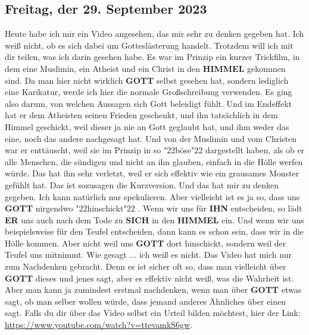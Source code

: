 \documentclass[10pt,a5paper]{article}
\newcommand{\Er}[0]{\textbf{ER}}
\newcommand{\Gott}[0]{\textbf{GOTT}}
\newcommand{\Himmel}[0]{\textbf{HIMMEL}}
\newcommand{\Ihn}[0]{\textbf{IHN}}
\newcommand{\Sich}[0]{\textbf{SICH}}
\newcommand{\q}[1]{\char"22{#1}\char"22 }
\begin{document}
	\subsection{Freitag, der 29. September 2023}
		Heute habe ich mir ein Video angesehen,
		das mir sehr zu denken gegeben hat.
		Ich wei{\ss} nicht,
		ob es sich dabei um Gottesl\"asterung handelt.
		Trotzdem will ich mit dir teilen,
		was ich darin gesehen habe.
		Es war im Prinzip ein kurzer Trickfilm,
		in dem eine Muslimin,
		ein Atheist und ein Christ in den {\Himmel} gekommen sind.
		Da man hier nicht wirklich {\Gott} selbst gesehen hat,
		sondern lediglich eine Karikatur,
		werde ich hier die normale Gro{\ss}schreibung verwenden.
		Es ging also darum,
		von welchen Aussagen sich Gott beleidigt f\"uhlt.
		Und im Endeffekt hat er dem Atheisten seinen Frieden geschenkt,
		und ihn tats\"achlich in dem Himmel geschickt,
		weil dieser ja nie an Gott geglaubt hat,
		und ihm weder das eine,
		noch das andere nachgesagt hat.
		Und von der Muslimin und vom Christen war er entt\"auscht,
		weil sie im Prinzip in so \q{b\"ose} dargestellt haben,
		als ob er alle Menschen,
		die s\"undigen und nicht an ihn glauben,
		einfach in die H\"olle werfen w\"urde.
		Das hat ihn sehr verletzt,
		weil er sich effektiv wie ein grausames Monster gef\"uhlt hat.
		Das ist sozusagen die Kurzversion.
		Und das hat mir zu denken gegeben.
		Ich kann nat\"urlich nur spekulieren.
		Aber vielleicht ist es ja so,
		dass uns {\Gott} nirgendwo \q{hinschickt}.
		Wenn wir uns f\"ur {\Ihn} entscheiden,
		so l\"adt {\Er} uns auch nach dem Tode zu {\Sich} in den {\Himmel} ein.
		Und wenn wir uns beispielsweise f\"ur den Teufel entscheiden,
		dann kann es schon sein,
		dass wir in die H\"olle kommen.
		Aber nicht weil uns {\Gott} dort hinschickt,
		sondern weil der Teufel uns mitnimmt.
		Wie gesagt ... ich wei{\ss} es nicht.
		Das Video hat mich nur zum Nachdenken gebracht.
		Denn es ist sicher oft so,
		dass man vielleicht \"uber {\Gott} dieses und jenes sagt,
		aber es effektiv nicht wei{\ss},
		was die Wahrheit ist.
		Aber man kann ja zumindest erstmal nachdenken,
		wenn man \"uber {\Gott} etwas sagt,
		ob man selber wollen w\"urde,
		dass jemand anderes \"Ahnliches \"uber einen sagt.
		Falls du dir \"uber das Video selbst ein Urteil bilden m\"ochtest,
		hier der Link: \url{https://www.youtube.com/watch?v=ttevamkS6gw}.
\end{document}
